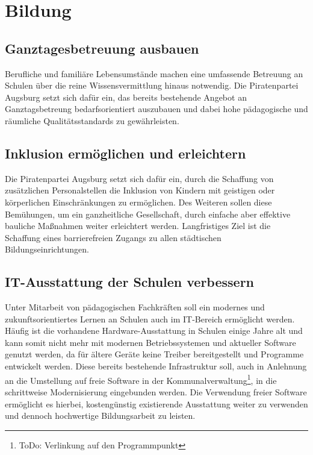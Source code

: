 \chapter{Bildung}
  
  \section{Ganztagesbetreuung ausbauen}
  
  Berufliche und familiäre Lebensumstände machen eine umfassende Betreuung an 
  Schulen über die reine Wissensvermittlung hinaus notwendig. Die 
  Piratenpartei Augsburg setzt sich dafür ein, das bereits bestehende Angebot 
  an Ganztagsbetreung bedarfsorientiert auszubauen und dabei hohe pädagogische 
  und räumliche Qualitätsstandards zu gewährleisten.
  
  \section{Inklusion ermöglichen und erleichtern}
  
  Die Piratenpartei Augsburg setzt sich dafür ein, durch die Schaffung von 
  zusätzlichen Personalstellen die Inklusion von Kindern mit geistigen oder 
  körperlichen Einschränkungen zu ermöglichen. Des Weiteren sollen diese 
  Bemühungen, um ein ganzheitliche Gesellschaft, durch einfache aber effektive 
  bauliche Maßnahmen weiter erleichtert werden. Langfristiges Ziel ist die 
  Schaffung eines barrierefreien Zugangs zu allen städtischen 
  Bildungseinrichtungen.
  
  \section{IT-Ausstattung der Schulen verbessern}
  
  Unter Mitarbeit von pädagogischen Fachkräften soll ein modernes und 
  zukunftsorientiertes Lernen an Schulen auch im IT-Bereich ermöglicht werden. 
  Häufig ist die vorhandene Hardware-Ausstattung in Schulen einige Jahre alt 
  und kann somit nicht mehr mit modernen Betriebssystemen und aktueller 
  Software genutzt werden, da für ältere Geräte keine Treiber bereitgestellt 
  und Programme entwickelt werden. Diese bereits bestehende Infrastruktur 
  soll, auch in Anlehnung an die Umstellung auf freie Software in der 
  Kommunalverwaltung\footnote{ToDo: Verlinkung auf den Programmpunkt}, in die 
  schrittweise Modernisierung eingebunden werden. Die Verwendung freier 
  Software ermöglicht es hierbei, kostengünstig existierende Ausstattung 
  weiter zu verwenden und dennoch hochwertige Bildungsarbeit zu leisten.
  
